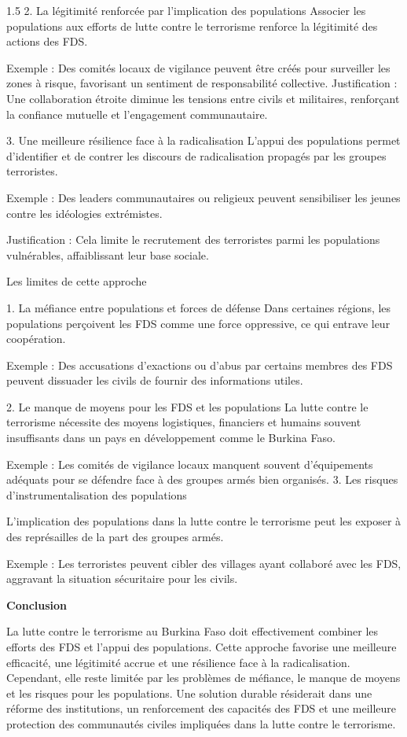 \documentclass[12pt]{article}
\begin{document}
\begin{spacing}{1.5}
2. La légitimité renforcée par l'implication des populations
Associer les populations aux efforts de lutte contre le terrorisme renforce la légitimité des actions des FDS.

Exemple : Des comités locaux de vigilance peuvent être créés pour surveiller les zones à risque, favorisant un sentiment de responsabilité collective.
Justification : Une collaboration étroite diminue les tensions entre civils et militaires, renforçant la confiance mutuelle et l'engagement communautaire.

3. Une meilleure résilience face à la radicalisation
L'appui des populations permet d'identifier et de contrer les discours de radicalisation propagés par les groupes terroristes.

Exemple : Des leaders communautaires ou religieux peuvent sensibiliser les jeunes contre les idéologies extrémistes.

Justification : Cela limite le recrutement des terroristes parmi les populations vulnérables, affaiblissant leur base sociale.

Les limites de cette approche

1. La méfiance entre populations et forces de défense
Dans certaines régions, les populations perçoivent les FDS comme une force oppressive, ce qui entrave leur coopération.

Exemple : Des accusations d'exactions ou d'abus par certains membres des FDS peuvent dissuader les civils de fournir des informations utiles.

2. Le manque de moyens pour les FDS et les populations
La lutte contre le terrorisme nécessite des moyens logistiques, financiers et humains souvent insuffisants dans un pays en développement comme le Burkina Faso.

Exemple : Les comités de vigilance locaux manquent souvent d'équipements adéquats pour se défendre face à des groupes armés bien organisés.
3. Les risques
 d'instrumentalisation des populations
 
L'implication des populations dans la lutte contre le terrorisme peut les exposer à des représailles de la part des groupes armés.

Exemple : Les terroristes peuvent cibler des villages ayant collaboré avec les FDS, aggravant la situation sécuritaire pour les civils.

\quad

\textbf{ Conclusion}

La lutte contre le terrorisme au Burkina Faso doit effectivement combiner les efforts des FDS et l'appui des populations. Cette approche favorise une meilleure efficacité, une légitimité accrue et une résilience face à la radicalisation. Cependant, elle reste limitée par les problèmes de méfiance, le manque de moyens et les risques pour les populations. Une solution durable résiderait dans une réforme des institutions, un renforcement des capacités des FDS et une meilleure protection des communautés civiles impliquées dans la lutte contre le terrorisme.




\end{spacing}
\end{document}
